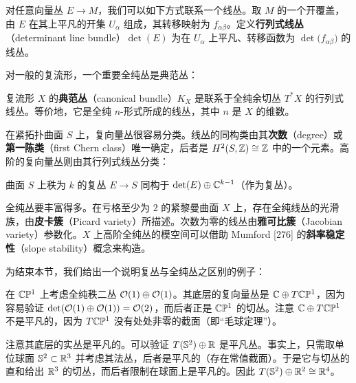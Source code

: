 对任意向量丛 $E\to M$，我们可以如下方式联系一个线丛。取 $M$ 的一个开覆盖，由 $E$ 在其上平凡的开集 $U_\alpha$ 组成，其转移映射为 $f_{\alpha\beta}$。定义\textbf{行列式线丛}（determinant line bundle）$\det(E)$ 为在 $U_\alpha$ 上平凡、转移函数为 $\det\big(f_{\alpha\beta}\big)$ 的线丛。

对一般的复流形，一个重要全纯丛是典范丛：

\begin{definition}[3.14]
复流形 $X$ 的\textbf{典范丛}（canonical bundle）$K_X$ 是联系于全纯余切丛 $T^\ast X$ 的行列式线丛。等价地，它是全纯 $n$-形式所成的线丛，其中 $n$ 是 $X$ 的维数。
\end{definition}

在紧拓扑曲面 $S$ 上，复向量丛很容易分类。线丛的同构类由其\textbf{次数}（degree）或\textbf{第一陈类}（first Chern class）唯一确定，后者是 $H^2(S,\mathbb{Z})\cong\mathbb{Z}$ 中的一个元素。高阶的复向量丛则由其行列式线丛分类：

\begin{proposition}[3.15]
曲面 $S$ 上秩为 $k$ 的复丛 $E\to S$ 同构于 $\det(E)\oplus\mathbb{C}^{k-1}$（作为复丛）。
\end{proposition}

全纯丛要丰富得多。在亏格至少为 $2$ 的紧黎曼曲面 $X$ 上，存在全纯线丛的光滑族，由\textbf{皮卡簇}（Picard variety）所描述。次数为零的线丛由\textbf{雅可比簇}（Jacobian variety）参数化。$X$ 上高阶全纯丛的模空间可以借助 Mumford [276] 的\textbf{斜率稳定性}（slope stability）概念来构造。

为结束本节，我们给出一个说明复丛与全纯丛之区别的例子：

\begin{example}[3.16]
在 $\mathbb{C}\mathbb{P}^1$ 上考虑全纯秩二丛 $\mathcal{O}(1)\oplus\mathcal{O}(1)$。其底层的复向量丛是 $\mathbb{C}\oplus T\mathbb{C}\mathbb{P}^1$，因为容易验证 $\det(\mathcal{O}(1)\oplus\mathcal{O}(1))=\mathcal{O}(2)$，而后者正是 $\mathbb{C}\mathbb{P}^1$ 的切丛。注意 $\mathbb{C}\oplus T\mathbb{C}\mathbb{P}^1$ 不是平凡的，因为 $T\mathbb{C}\mathbb{P}^1$ 没有处处非零的截面（即“毛球定理”）。
\end{example}

注意其底层的实丛是平凡的。可以验证 $T(\mathbb{S}^2)\oplus\mathbb{R}$ 是平凡丛。事实上，只需取单位球面 $\mathbb{S}^2\subset\mathbb{R}^3$ 并考虑其法丛，后者是平凡的（存在常值截面）。于是它与切丛的直和给出 $\mathbb{R}^3$ 的切丛，而后者限制在球面上是平凡的。因此 $T(\mathbb{S}^2)\oplus\mathbb{R}^2\cong\mathbb{R}^4$。

